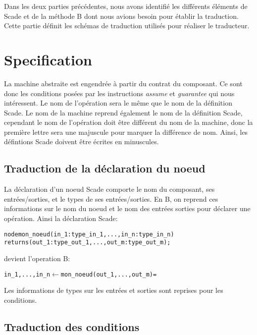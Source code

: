 


Dans les deux parties précédentes, nous avons identifié les différents
éléments de Scade et de la méthode B dont nous avions besoin pour
établir la traduction. Cette partie définit les schémas de traduction
utilisés pour réaliser le traducteur. \\

\section{Specification}

La machine abstraite est engendrée à partir du contrat du composant. Ce sont
donc les conditions posées par les instructions \emph{assume} et
\emph{guarantee} qui nous intéressent. Le nom de l'opération sera le même que le
nom de la définition Scade. Le nom de la machine reprend également le nom de la
définition Scade, cependant le nom de l'opération doit être différent du nom de
la machine, donc la première lettre sera une majuscule pour marquer la
différence de nom. Ainsi, les défintions Scade doivent être écrites en
minuscules.

\subsection{Traduction de la déclaration du noeud}
La déclaration d'un noeud Scade comporte le nom du composant, ses
entrées/sorties, et le types de ses entrées/sorties. En B, on reprend ces
informations sur le nom du noeud et le nom des entrées sorties pour déclarer une
opération. Ainsi la déclaration Scade: 
\begin{alltt}
node mon\_noeud (in_1: type\_in_1, ..., in_n: type\_in_n) 
                returns (out_1: type\_out_1, ..., out_m: type\_out_m);
\end{alltt}
devient l'operation B:
\begin{alltt}
in_1, ..., in_n \(\leftarrow\) mon\_noeud(out_1, ..., out_m) =
\end{alltt}

Les informations de types sur les entrées et sorties sont reprises pour les
conditions.


\subsection{Traduction des conditions}

